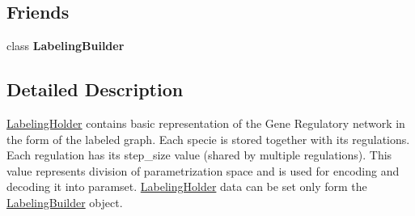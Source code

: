 \subsection*{\-Friends}
\begin{DoxyCompactItemize}
\item 
\hypertarget{classLabelingHolder_af2136cc7df4f046e74b74f51de6901ac}{class {\bfseries \-Labeling\-Builder}}\label{classLabelingHolder_af2136cc7df4f046e74b74f51de6901ac}

\end{DoxyCompactItemize}


\subsection{\-Detailed \-Description}
\hyperlink{classLabelingHolder}{\-Labeling\-Holder} contains basic representation of the \-Gene \-Regulatory network in the form of the labeled graph. \-Each specie is stored together with its regulations. \-Each regulation has its step\-\_\-size value (shared by multiple regulations). \-This value represents division of parametrization space and is used for encoding and decoding it into paramset. \hyperlink{classLabelingHolder}{\-Labeling\-Holder} data can be set only form the \hyperlink{classLabelingBuilder}{\-Labeling\-Builder} object. 

